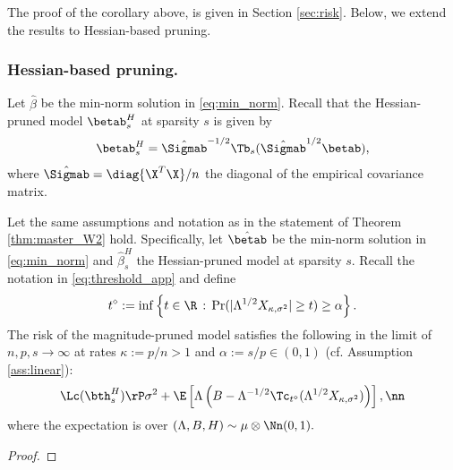The proof of the corollary above, is given in Section \ref{sec:risk}. Below, we extend the results to Hessian-based pruning.


\subsubsection{Hessian-based pruning.}
Let $\hat\beta$ be the min-norm solution in \eqref{eq:min_norm}. Recall that the Hessian-pruned model $\betab_s^H$ at sparsity $s$ is given by
\begin{align}\label{eq:hp}
\betab_s^H = \hat\Sigmab^{-1/2}\Tb_s(\hat\Sigmab^{1/2}\betab),
\end{align}
where $\hat\Sigmab=\diag{\X^T\X}/n$ the diagonal of the empirical covariance matrix. 

\begin{corollary}\label{cor:hes}
Let the same assumptions and notation as in the statement of Theorem \ref{thm:master_W2} hold. Specifically, let $\hat\betab$ be the min-norm solution in \eqref{eq:min_norm} and $\hat\beta_s^H$ the Hessian-pruned model at sparsity $s$. Recall the notation in \eqref{eq:threshold_app} and define
\begin{align}\label{eq:tdiam_app}
t^\diamond:=\inf\left\{t\in\R\,:\, \Pr(|\Lambda^{1/2}X_{\kappa,\sigma^2}|\geq t) \geq \alpha \right\}.
\end{align}
The risk of the magnitude-pruned model satisfies the following in the limit of $n,p,s\rightarrow\infty$ at rates $\kappa:=p/n>1$ and $\alpha:=s/p\in(0,1)$ (cf. Assumption \ref{ass:linear}):
\begin{align}
\Lc(\bth^H_s) \rP \sigma^2 + \E\left[ \Lambda\left(B-\Lambda^{-1/2}\Tc_{t^\diamond}(\Lambda^{1/2}X_{\kappa,\sigma^2})\right) \right],\nn
\end{align}
where the expectation is over $(\Lambda,B,H)\sim\mu\otimes\Nn(0,1).$
\end{corollary}
\begin{proof}
\end{proof}


